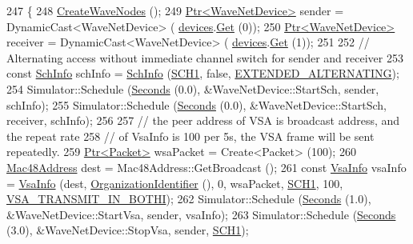 \begin{DoxyCode}
247 \{
248   \hyperlink{classWaveNetDeviceExample_a825285810121c865230f6fafe6428081}{CreateWaveNodes} ();
249   \hyperlink{classns3_1_1Ptr}{Ptr<WaveNetDevice>}  sender = DynamicCast<WaveNetDevice> (
      \hyperlink{classWaveNetDeviceExample_a4b88c787809e6171c04eba282d1a1715}{devices}.\hyperlink{classns3_1_1NetDeviceContainer_a677d62594b5c9d2dea155cc5045f4d0b}{Get} (0));
250   \hyperlink{classns3_1_1Ptr}{Ptr<WaveNetDevice>}  receiver = DynamicCast<WaveNetDevice> (
      \hyperlink{classWaveNetDeviceExample_a4b88c787809e6171c04eba282d1a1715}{devices}.\hyperlink{classns3_1_1NetDeviceContainer_a677d62594b5c9d2dea155cc5045f4d0b}{Get} (1));
251 
252 \textcolor{comment}{// Alternating access without immediate channel switch for sender and receiver}
253   \textcolor{keyword}{const} \hyperlink{structns3_1_1SchInfo}{SchInfo} schInfo = \hyperlink{structns3_1_1SchInfo}{SchInfo} (\hyperlink{channel-manager_8h_a456a1b730523e5d3b8a29fb227d10028}{SCH1}, \textcolor{keyword}{false}, 
      \hyperlink{channel-scheduler_8h_a0e1f74c3cb8f78904dd1ae957412392e}{EXTENDED\_ALTERNATING});
254   Simulator::Schedule (\hyperlink{group__timecivil_ga33c34b816f8ff6628e33d5c8e9713b9e}{Seconds} (0.0), &WaveNetDevice::StartSch, sender, schInfo);
255   Simulator::Schedule (\hyperlink{group__timecivil_ga33c34b816f8ff6628e33d5c8e9713b9e}{Seconds} (0.0), &WaveNetDevice::StartSch, receiver, schInfo);
256 
257 \textcolor{comment}{// the peer address of VSA is broadcast address, and the repeat rate}
258 \textcolor{comment}{// of VsaInfo is 100 per 5s, the VSA frame will be sent repeatedly.}
259   \hyperlink{classns3_1_1Ptr}{Ptr<Packet>} wsaPacket = Create<Packet> (100);
260   \hyperlink{classns3_1_1Mac48Address}{Mac48Address} dest = Mac48Address::GetBroadcast ();
261   \textcolor{keyword}{const} \hyperlink{structns3_1_1VsaInfo}{VsaInfo} vsaInfo = \hyperlink{structns3_1_1VsaInfo}{VsaInfo} (dest, \hyperlink{classns3_1_1OrganizationIdentifier}{OrganizationIdentifier} (), 0, 
      wsaPacket, \hyperlink{channel-manager_8h_a456a1b730523e5d3b8a29fb227d10028}{SCH1}, 100, \hyperlink{namespacens3_a417ab130a77d452a8b5014090665bcc1aae42365483bb4ad44a43f5e31f4a3495}{VSA\_TRANSMIT\_IN\_BOTHI});
262   Simulator::Schedule (\hyperlink{group__timecivil_ga33c34b816f8ff6628e33d5c8e9713b9e}{Seconds} (1.0), &WaveNetDevice::StartVsa, sender, vsaInfo);
263   Simulator::Schedule (\hyperlink{group__timecivil_ga33c34b816f8ff6628e33d5c8e9713b9e}{Seconds} (3.0), &WaveNetDevice::StopVsa, sender, 
      \hyperlink{channel-manager_8h_a456a1b730523e5d3b8a29fb227d10028}{SCH1});

\end{DoxyCode}

